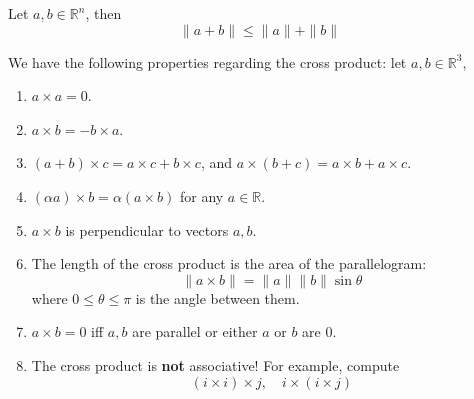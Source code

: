 \documentclass[openany]{book}
\newcommand{\R}{\mathbb{R}}
\begin{document}
\begin{prop}\label{traingle}
    Let $a,b\in\R^n$, then 
    \begin{equation*}
        \|a+b\|\leq\|a\|+\|b\|
    \end{equation*}
\end{prop}


\begin{prop}
    We have the following properties regarding the cross product: let $a,b\in\R^3$,
    \begin{enumerate}
        \item $a\times a=0$.
        \item $a\times b=-b\times a$.
        \item $(a+b)\times c=a\times c+b\times c$, and $a\times (b+c)=a\times b+a\times c$.
        \item $(\alpha a)\times b=\alpha(a\times b)$ for any $a\in\R$.
        \item $a\times b$ is perpendicular to vectors $a,b$.
        \item The length of the cross product is the area of the parallelogram:
        \begin{equation*}
            \|a\times b\|=\|a\|\|b\|\sin\theta
        \end{equation*}
        where $0\leq\theta\leq\pi$ is the angle between them. 
        \item $a\times b=0$ iff $a,b$ are parallel or either $a$ or $b$ are $0$.
        \item The cross product is \textbf{not} associative! For example, compute 
        \begin{equation*}
            (i\times i)\times j, \quad i\times (i\times j)
        \end{equation*}
    \end{enumerate}
\end{prop}
\end{document}
